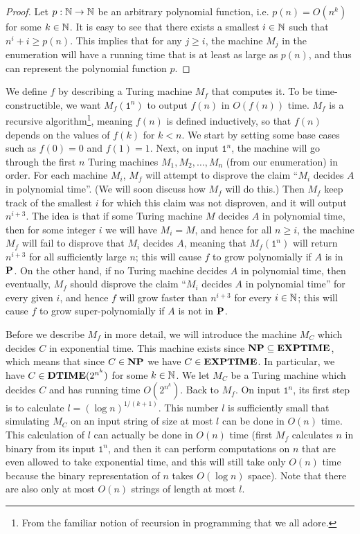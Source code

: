 \begin{proof}
  Let $p : \mathbb N \to \mathbb N$ be an arbitrary polynomial function, i.e. $p(n) = O(n^k)$ for some $k \in \mathbb N$. It is easy to see that there exists a smallest $i \in \mathbb N$ such that $n^i + i \geq p(n)$. This implies that for any $j \geq i$, the machine $M_j$ in the enumeration will have a running time that is at least as large as $p(n)$, and thus can represent the polynomial function $p$.
\end{proof}

We define $f$ by describing a Turing machine $M_f$ that computes it. To be time-constructible, we want $M_f(\texttt{1}^n)$ to output $f(n)$ in $O(f(n))$ time. $M_f$ is a recursive algorithm\footnote{From the familiar notion of recursion in programming that we all adore.}, meaning $f(n)$ is defined inductively, so that $f(n)$ depends on the values of $f(k)$ for $k < n$. We start by setting some base cases such as $f(0) = 0$ and $f(1) = 1$. Next, on input $\texttt{1}^n$, the machine will go through the first $n$ Turing machines $M_1, M_2, \dots, M_n$ (from our enumeration) in order. For each machine $M_i$, $M_f$ will attempt to disprove the claim ``$M_i$ decides $A$ in polynomial time''. (We will soon discuss how $M_f$ will do this.) Then $M_f$ keep track of the smallest $i$ for which this claim was not disproven, and it will output $n^{i + 3}$. The idea is that if some Turing machine $M$ decides $A$ in polynomial time, then for some integer $i$ we will have $M_i = M$, and hence for all $n \geq i$, the machine $M_f$ will fail to disprove that $M_i$ decides $A$, meaning that $M_f(\texttt{1}^n)$ will return $n^{i + 3}$ for all sufficiently large $n$; this will cause $f$ to grow polynomially if $A$ is in $\textbf{P}$. On the other hand, if no Turing machine decides $A$ in polynomial time, then eventually, $M_f$ should disprove the claim ``$M_i$ decides $A$ in polynomial time'' for every given $i$, and hence $f$ will grow faster than $n^{i + 3}$ for every $i \in \mathbb N$; this will cause $f$ to grow super-polynomially if $A$ is not in $\textbf{P}$.

Before we describe $M_f$ in more detail, we will introduce the machine $M_C$ which decides $C$ in exponential time. This machine exists since $\textbf{NP} \subseteq \textbf{EXPTIME}$, which means that since $C \in \textbf{NP}$ we have $C \in \textbf{EXPTIME}$. In particular, we have $C \in \textbf{DTIME}(2^{n^k})$ for some $k \in \mathbb N$. We let $M_C$ be a Turing machine which decides $C$ and has running time $O(2^{n^k})$. Back to $M_f$. On input $\texttt{1}^n$, its first step is to calculate $l = (\log n)^{1 / (k + 1)}$. This number $l$ is sufficiently small that simulating $M_C$ on an input string of size at most $l$ can be done in $O(n)$ time. This calculation of $l$ can actually be done in $O(n)$ time (first $M_f$ calculates $n$ in binary from its input $\texttt{1}^n$, and then it can perform computations on $n$ that are even allowed to take exponential time, and this will still take only $O(n)$ time because the binary representation of $n$ takes $O(\log n)$ space). Note that there are also only at most $O(n)$ strings of length at most $l$.

